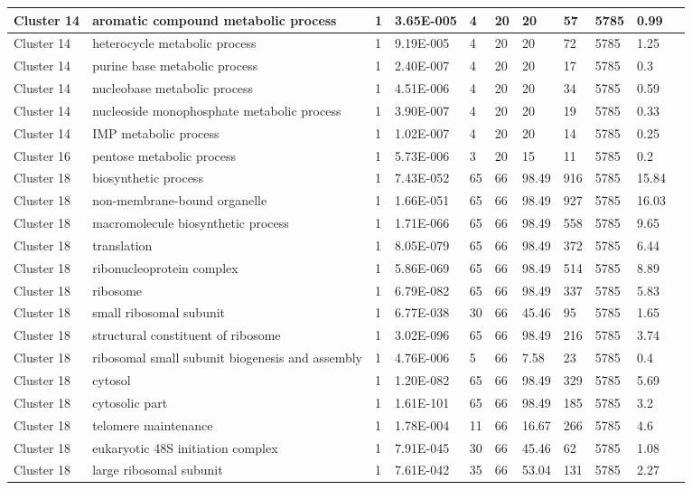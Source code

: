 \begin{tabular}{|l|l|l|l|l|l|l|l|l|l|l|}
\hline
Cluster 14&aromatic compound metabolic process&1&3.65E-005&4&20&20&57&5785&0.99&\\
\hline
Cluster 14&heterocycle metabolic process&1&9.19E-005&4&20&20&72&5785&1.25&\\
\hline
Cluster 14&purine base metabolic process&1&2.40E-007&4&20&20&17&5785&0.3&\\
\hline
Cluster 14&nucleobase metabolic process&1&4.51E-006&4&20&20&34&5785&0.59&\\
\hline
Cluster 14&nucleoside monophosphate metabolic process&1&3.90E-007&4&20&20&19&5785&0.33&\\
\hline
Cluster 14&IMP metabolic process&1&1.02E-007&4&20&20&14&5785&0.25&\\
\hline
Cluster 16&pentose metabolic process&1&5.73E-006&3&20&15&11&5785&0.2&\\
\hline
Cluster 18&biosynthetic process&1&7.43E-052&65&66&98.49&916&5785&15.84&\\
\hline
Cluster 18&non-membrane-bound organelle&1&1.66E-051&65&66&98.49&927&5785&16.03&\\
\hline
Cluster 18&macromolecule biosynthetic process&1&1.71E-066&65&66&98.49&558&5785&9.65&\\
\hline
Cluster 18&translation&1&8.05E-079&65&66&98.49&372&5785&6.44&\\
\hline
Cluster 18&ribonucleoprotein complex&1&5.86E-069&65&66&98.49&514&5785&8.89&\\
\hline
Cluster 18&ribosome&1&6.79E-082&65&66&98.49&337&5785&5.83&\\
\hline
Cluster 18&small ribosomal subunit&1&6.77E-038&30&66&45.46&95&5785&1.65&\\
\hline
Cluster 18&structural constituent of ribosome&1&3.02E-096&65&66&98.49&216&5785&3.74&\\
\hline
Cluster 18&ribosomal small subunit biogenesis and assembly&1&4.76E-006&5&66&7.58&23&5785&0.4&\\
\hline
Cluster 18&cytosol&1&1.20E-082&65&66&98.49&329&5785&5.69&\\
\hline
Cluster 18&cytosolic part&1&1.61E-101&65&66&98.49&185&5785&3.2&\\
\hline
Cluster 18&telomere maintenance&1&1.78E-004&11&66&16.67&266&5785&4.6&\\
\hline
Cluster 18&eukaryotic 48S initiation complex&1&7.91E-045&30&66&45.46&62&5785&1.08&\\
\hline
Cluster 18&large ribosomal subunit&1&7.61E-042&35&66&53.04&131&5785&2.27&\\

\end{tabular}
